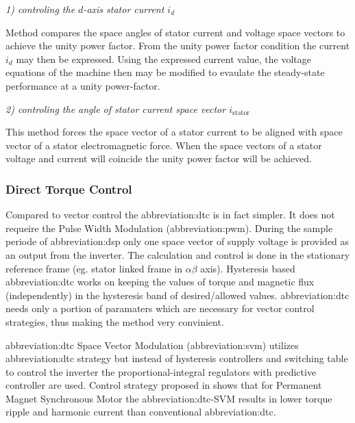 \documentclass[a4paper, twoside, 11pt]{article}
\begin{document}
             \vspace*{1cm}
             \textit{1) controling the $d$-axis stator current $i_d$}\par
             \hspace*{\parindent} Method compares the space angles of stator current and voltage space vectors to achieve the unity power factor. From the unity power factor condition the current $i_d$ may then be expressed. Using the expressed current value, the voltage equations of the machine then may be modified to evaulate the steady-state performance at a unity power-factor. \cite{moussa-unity-power-factor-control-of-permanent-magnet-motor-drive-system}

             \vspace*{1cm}
             \textit{2) controling the angle of stator current space vector $i_\text{stator}$}\par
             \hspace*{\parindent} This method forces the space vector of a stator current to be aligned with space vector of a stator electromagnetic force. When the space vectors of a stator voltage and current will coincide the unity power factor will be achieved. \cite{moussa-unity-power-factor-control-of-permanent-magnet-motor-drive-system}

        \subsubsection{Direct Torque Control}
            Compared to vector control the \gls{abbreviation:dtc} is in fact simpler. It does not requeire the Pulse Width Modulation (\gls{abbreviation:pwm}). During the sample periode of \gls{abbreviation:dsp} only one space vector of supply voltage is provided as an output from the inverter. The calculation and control is done in the stationary reference frame (eg. stator linked frame in $\alpha \beta$ axis). Hysteresis based \gls{abbreviation:dtc} works on keeping the values of torque and magnetic flux (independently) in the hysteresis band of desired/allowed values. \gls{abbreviation:dtc} needs only a portion of paramaters which are necessary for vector control strategies, thus making the method very convinient. \cite{dwivedi-review-on-control-strategies-of-permanent-magnet-assisted-synchronous-reluctance-motor-drive}\par
            \gls{abbreviation:dtc} Space Vector Modulation (\gls{abbreviation:svm}) utilizes \gls{abbreviation:dtc} strategy but instead of hysteresis controllers and switching table to control the inverter the proportional-integral regulators with predictive controller are used. Control strategy proposed in \cite{swierczynski-dsp-based-direct-torque-control-of-permanent-magnet-synchronous-motor-using-space-vector-modulation-dtcsvm} shows that for Permanent Magnet Synchronous Motor the \gls{abbreviation:dtc}-SVM results in lower torque ripple and harmonic current than conventional \gls{abbreviation:dtc}.
\end{document}
